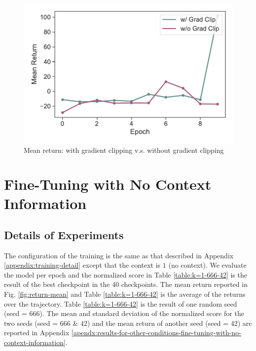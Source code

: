 \documentclass{article}
\begin{document}
\begin{figure}[h]
    \begin{minipage}[b]{0.32\linewidth}
        \includegraphics[width=\linewidth]{figs/returnmean_igpt_no_grad_clip_walker2d_medium_666.pdf}
    \end{minipage}
    \caption{Mean return: with gradient clipping v.s. without gradient clipping}
    \label{fig:mean-return-igpt-no-grad-clip}
\end{figure}

\section{Fine-Tuning with No Context Information}
\label{appendix:dependency-on-context-informaiton}

\subsection{Details of Experiments}
\label{appendix:detail-of-experiments-dependency-on-context-informaiton}
The configuration of the training is the same as that described in Appendix \ref{appendix:training-detail} except that the context is $1$ (no context). We evaluate the model per epoch and the normalized score in Table \ref{table:k=1-666-42} is the result of the best checkpoint in the 40 checkpoints. The mean return reported in Fig. \ref{fig:return-mean} and Table \ref{table:k=1-666-42} is the average of the returns over the trajectory. Table \ref{table:k=1-666-42} is the result of one random seed (seed = 666). The mean and standard deviation of the normalized score for the two seeds (seed = 666 \& 42) and the mean return of another seed (seed = 42) are reported in Appendix \ref{apendx:results-for-other-conditions-fine-tuning-with-no-context-information}.
\end{document}
